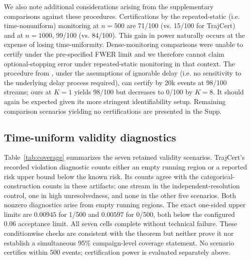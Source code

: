 We also note additional considerations arising from the supplementary comparisons against these procedures. Certifications by the repeated-static (i.e. time-nonuniform) monitoring at $n = 500$ are 71/100 (vs. 15/100 for TrajCert) and at $n = 1000$, 99/100 (vs. 84/100). This gain in power naturally occurs at the expense of losing time-uniformity. Dense-monitoring comparisons were unable to certify under the pre-specified FWER limit and we therefore cannot claim optional-stopping error under repeated-static monitoring in that context. The procedure from \cite{...}, under the assumptions of ignorable delay (i.e. no sensitivity to the underlying delay process required), can certify by 20k events at 98/100 streams; ours at $K=1$ yields 98/100 but decreases to 0/100 by $K=8$. It should again be expected given its more stringent identifiability setup. Remaining comparison scenarios yielding no certifications are presented in the Supp.

\subsection{Time-uniform validity diagnostics}
Table~\ref{tab:coverage} summarizes the seven retained validity scenarios. TrajCert's recorded violation diagnostic counts either an empty running region or a reported risk upper bound below the known risk. Its counts agree with the categorical-construction counts in these artifacts: one stream in the independent-resolution control, one in high unresolvedness, and none in the other five scenarios. Both nonzero diagnostics arise from empty running regions. The exact one-sided upper limits are $0.00945$ for 1/500 and $0.00597$ for 0/500, both below the configured 0.06 acceptance limit. All seven cells complete without technical failure. These conditionwise checks are consistent with the theorem but neither prove it nor establish a simultaneous 95\% campaign-level coverage statement. No scenario certifies within 500 events; certification power is evaluated separately above.

\begin{table}[!htbp]\centering
\caption{Time-uniform validity diagnostics through 500 matured events per stream, with risk projections at 100-event checkpoints. Each scenario has 500 independent streams. Limits are exact one-sided 95\% limits for the recorded ever-violation event, separately by scenario. The configured acceptance limit is 0.06, while the nominal theoretical level is $\delta=0.05$.}\label{tab:coverage}

\end{table}

